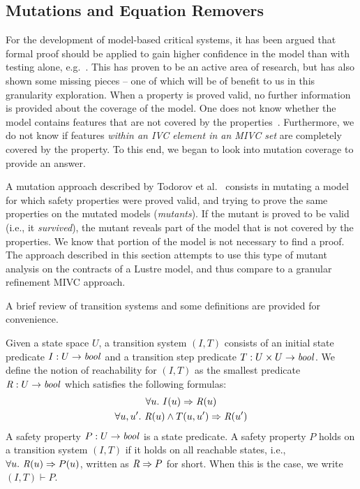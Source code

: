 \subsection{Mutations and Equation Removers}
For the development of model-based critical systems, it has been argued that formal proof should be applied to gain higher confidence in the model than with testing alone, e.g.~\cite{hardin2009development,miller2010software,rushby2009software,bozzano2003improving}. This has proven to be an active area of research, but has also shown some missing pieces -- one of which will be of benefit to us in this granularity exploration. When a property is proved valid, no further information is provided about the coverage of the model. One does not know whether the model contains features that are not covered by the properties~\cite{NFM2020Todorov}. Furthermore, we do not know if features \emph{within an IVC element in an MIVC set} are completely covered by the property. To this end, we began to look into mutation coverage to provide an answer. 

A mutation approach described by Todorov et al.~\cite{NFM2020Todorov} consists in mutating a model for which safety properties were proved valid, and trying to prove the same properties on the mutated models (\emph{mutants}). If the mutant is proved to be valid (i.e., it \emph{survived}), the mutant reveals part of the model that is not covered by the properties. We know that portion of the model is not necessary to find a proof. The approach described in this section attempts to use this type of mutant analysis on the contracts of a Lustre model, and thus compare to a granular refinement MIVC approach. 

A brief review of transition systems and some definitions are provided for convenience. 

Given a state space $U$, a transition system $(I,T)$ consists of an
initial state predicate $I : U \to \mathit{bool}$ and a transition step
predicate $T : U \times U \to \mathit{bool}$.
We define the notion of
reachability for $(I, T)$ as the smallest predicate $\mathit{R} : U \to
\mathit{bool}$ which satisfies the following formulas:
\begin{gather*}
  \forall u.~ I(u) \Rightarrow \mathit{R}(u) \\
  \forall u, u'.~ \mathit{R}(u) \land T(u, u') \Rightarrow \mathit{R}(u')
\end{gather*}
A safety property $P : U \to \mathit{bool}$ is a state predicate. A safety
property $P$ holds on a transition system $(I, T)$ if it holds on all
reachable states, i.e., $\forall u.~ \mathit{R}(u) \Rightarrow P(u)$,
written as $\mathit{R} \Rightarrow P$ for short. When this is the case, we
write $(I, T)\vdash P$.

